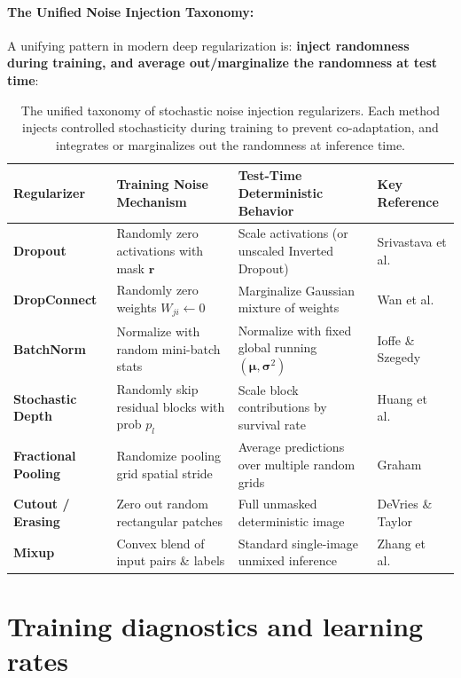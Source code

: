 \paragraph{The Unified Noise Injection Taxonomy:}
A unifying pattern in modern deep regularization is: \textbf{inject randomness during training, and average out/marginalize the randomness at test time}:
\begin{table}[H]
\centering
\small
\begin{tabular}{@{}llll@{}}
\toprule
\textbf{Regularizer} & \textbf{Training Noise Mechanism} & \textbf{Test-Time Deterministic Behavior} & \textbf{Key Reference} \\ \midrule
\textbf{Dropout} & Randomly zero activations with mask $\mathbf{r}$ & Scale activations (or unscaled Inverted Dropout) & Srivastava et al.~\cite{srivastava2014dropout} \\
\textbf{DropConnect} & Randomly zero weights $W_{ji} \leftarrow 0$ & Marginalize Gaussian mixture of weights & Wan et al.~\cite{wan2013regularization} \\
\textbf{BatchNorm} & Normalize with random mini-batch stats & Normalize with fixed global running $(\boldsymbol{\mu}, \boldsymbol{\sigma}^2)$ & Ioffe \& Szegedy~\cite{ioffe2015batch} \\
\textbf{Stochastic Depth} & Randomly skip residual blocks with prob $p_l$ & Scale block contributions by survival rate & Huang et al.~\cite{huang2016deep} \\
\textbf{Fractional Pooling} & Randomize pooling grid spatial stride & Average predictions over multiple random grids & Graham~\cite{graham2014fractional} \\
\textbf{Cutout / Erasing} & Zero out random rectangular patches & Full unmasked deterministic image & DeVries \& Taylor~\cite{devries2017cutout} \\
\textbf{Mixup} & Convex blend of input pairs \& labels & Standard single-image unmixed inference & Zhang et al.~\cite{zhang2018mixup} \\ \bottomrule
\end{tabular}
\caption{The unified taxonomy of stochastic noise injection regularizers. Each method injects controlled stochasticity during training to prevent co-adaptation, and integrates or marginalizes out the randomness at inference time.}
\label{tab:noise_injection_taxonomy}
\end{table}

\section{Training diagnostics and learning rates}
\label{sec:training_dynamics_babysitting}

